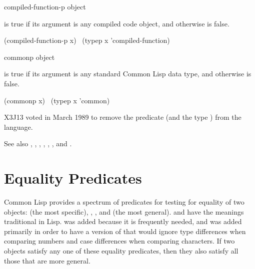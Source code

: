 \begin{defun}[Function]
compiled-function-p object

 is true if its argument is any compiled code object,
and otherwise is false.
\begin{lisp}
(compiled-function-p x) \EQ\ (typep x 'compiled-function)
\end{lisp}
\end{defun}

\begin{obsolete}
\begin{defun}[Function]
commonp object

 is true if its argument is any standard Common Lisp data type,
and otherwise is false.
\begin{lisp}
(commonp x) \EQ\ (typep x 'common)
\end{lisp}
\end{defun}
\end{obsolete}

\begin{newer}
X3J13 voted in March 1989
to remove the predicate  (and the type ) from the language.
\end{newer}

\medskip

See also , ,
, ,
,
, and .

\section{Equality Predicates}

Common Lisp provides a spectrum of predicates for testing for equality of
two objects:  (the most specific), , , and 
(the most general).   and  have the meanings traditional
in Lisp.   was added because it is frequently needed, and
 was added primarily in order to have a version of 
that would ignore type differences when comparing numbers
and case differences when comparing characters.
If two objects satisfy any one of these equality predicates,
then they also satisfy all those that are more general.

